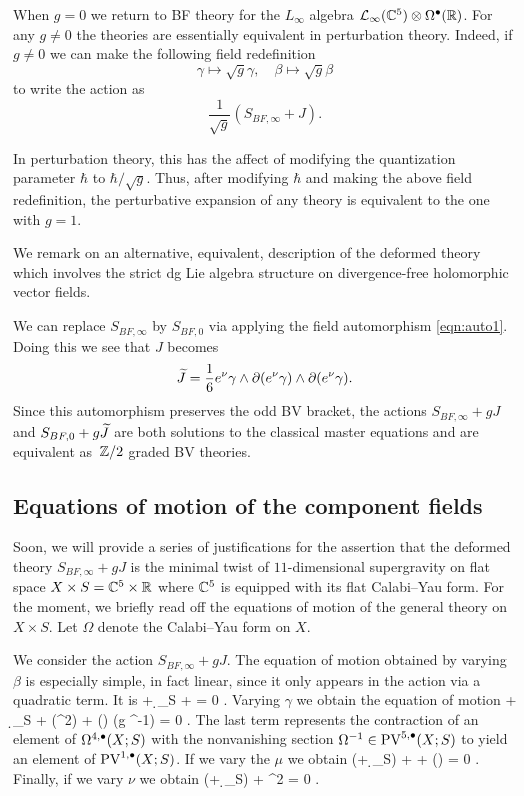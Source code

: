 When $g = 0$ we return to BF theory for the $L_\infty$ algebra $\mathcal L_\infty(\mathbb C^5) \otimes \Omega^\bullet(\mathbb R)$. 
For any $g \ne 0$ the theories are essentially equivalent in perturbation theory. 
Indeed, if $g \ne 0$ we can make the following field redefinition 
\[
\gamma \mapsto \sqrt{g} \gamma, \quad \beta \mapsto \sqrt{g} \beta 
\]
to write the action as 
\[
\frac{1}{\sqrt{g}} \left(S_{BF,\infty} + J \right)  .
\]

In perturbation theory, this has the affect of modifying the quantization parameter $\hbar$ to $\hbar / \sqrt{g}$.
Thus, after modifying $\hbar$ and making the above field redefinition, the perturbative expansion of any theory is equivalent to the one with $g = 1$. 

\parsec[s:altdfn]

We remark on an alternative, equivalent, description of the deformed theory which involves the strict dg Lie algebra structure on divergence-free holomorphic vector fields.

We can replace $S_{BF,\infty}$ by $S_{BF,0}$ via applying the field automorphism \eqref{eqn:auto1}.
Doing this we see that $J$ becomes 
\[
\widetilde{J} = \frac16 e^\nu \gamma \wedge \partial (e^\nu \gamma) \wedge \partial(e^\nu \gamma) .
\]
Since this automorphism preserves the odd BV bracket, the actions $S_{BF,\infty} + g J$ and $S_{BF, 0} + g \widetilde{J}$ are both solutions to the classical master equations and are equivalent as~$\mathbb Z/2$ graded BV theories.

\subsection{Equations of motion of the component fields} \label{s:components}

Soon, we will provide a series of justifications for the assertion that the deformed theory $S_{BF, \infty} + g J$ is the minimal twist of $11$-dimensional supergravity on flat space $X \times S = \mathbb C^5 \times \mathbb R$ where $\mathbb C^5$ is equipped with its flat Calabi--Yau form. 
For the moment, we briefly read off the equations of motion of the general theory on $X \times S$.
Let $\Omega$ denote the Calabi--Yau form on $X$. 

We consider the action $S_{BF, \infty} + gJ$.
The equation of motion obtained by varying $\beta$ is especially simple, in fact linear, since it only appears in the action via a quadratic term. 
It is
\beqn\label{eqn:eombeta}
\dbar \nu + \d_S \nu + \div \mu = 0 .
\eeqn
Varying $\gamma$ we obtain the equation of motion
\beqn\label{eqn:eomgamma}
\dbar \mu + \d_S \mu +   \div (\mu^2) +  (\del \gamma \wedge \del \gamma) \vee (g \Omega^{-1}) = 0 .
\eeqn
The last term represents the contraction of an element of $\Omega^{4,\bullet}(X;S)$ with the nonvanishing section $\Omega^{-1} \in {\rm PV}^{5,\bullet}(X;S)$ to yield an element of ${\rm PV}^{1,\bullet}(X;S)$. 
If we vary the $\mu$ we obtain 
\beqn\label{eqn:eommu}
(\dbar + \d_S) \gamma + \del \beta +  (\mu \vee \del \gamma) = 0 .
\eeqn
Finally, if we vary $\nu$ we obtain
\beqn\label{eqn:eomnu}
(\dbar + \d_S) \beta +   \mu^2 \vee \del \gamma = 0 .
\eeqn

